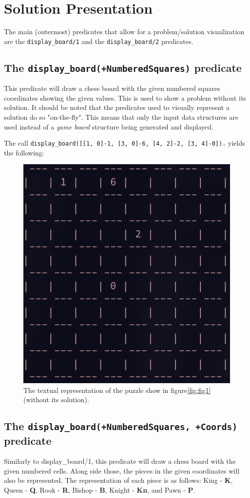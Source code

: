 \documentclass[runningheads]{llncs}
\newcommand{\inlinecode}[1]{\texttt{#1}}
\begin{document}
\section{Solution Presentation}

The main (outermost) predicates that allow for a problem/solution visualization
are the \inlinecode{display\_board/1} and the \inlinecode{display\_board/2} predicates.

\subsection{The \inlinecode{display\_board(+NumberedSquares)} predicate}

This predicate will draw a chess board with the given numbered squares coordinates
showing the given values. This is used to show a problem without its solution. It
should be noted that the predicates used to visually represent a solution do so
"on-the-fly". This means that only the input data structures are used instead of
a \textit{game board} structure being generated and displayed.

The call \inlinecode{display\_board([[1, 0]-1, [3, 0]-6, [4, 2]-2, [3, 4]-0]).}
yields the following:
\begin{figure}[H]
  \centering
  \includegraphics[width=0.4\linewidth]{figures/display_board_1.png}
  \caption{The textual representation of the puzzle show in figure\ref{fig:fig1}
  (without its solution).}\label{fig:fig2}
\end{figure}

\subsection{The \inlinecode{display\_board(+NumberedSquares, +Coords)} predicate}

Similarly to display\_board/1, this predicate will draw a chess board with the given
numbered cells. Along side those, the pieces in the given coordinates will also be
represented. The representation of each piece is as follows: King - \textbf{K},
Queen - \textbf{Q}, Rook - \textbf{R}, Bishop - \textbf{B}, Knight - \textbf{Kn},
and Pawn - \textbf{P}.
\end{document}
